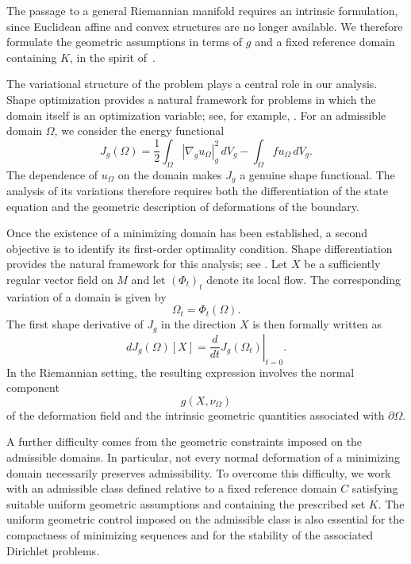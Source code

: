 \documentclass{article}
\begin{document}
The passage to a general Riemannian manifold requires an intrinsic formulation, since Euclidean affine and convex structures are no longer available. We therefore formulate the geometric assumptions in terms of $g$ and a fixed reference domain containing $K$, in the spirit of~\cite{Schu}.

The variational structure of the problem plays a central role in our
analysis. Shape optimization provides a natural framework for problems
in which the domain itself is an optimization variable; see, for
example, \cite{DZ,HP,sozo}. For an admissible domain $\Omega$, we
consider the energy functional
\begin{equation}
J_g(\Omega)
=
\frac12
\int_\Omega
|\nabla_g u_\Omega|_g^2\,dV_g
-
\int_\Omega f u_\Omega\,dV_g.
\label{eq:shape-functional-introduction}
\end{equation}
The dependence of $u_\Omega$ on the domain makes $J_g$ a genuine shape
functional. The analysis of its variations therefore requires both the
differentiation of the state equation and the geometric description of
deformations of the boundary.

Once the existence of a minimizing domain has been established, a
second objective is to identify its first-order optimality condition.
Shape differentiation provides the natural framework for this analysis;
see \cite{Da1,DZ,HP}. Let $X$ be a sufficiently regular vector field on
$M$ and let $(\Phi_t)_t$ denote its local flow. The corresponding
variation of a domain is given by
\[
\Omega_t=\Phi_t(\Omega).
\]
The first shape derivative of $J_g$ in the direction $X$ is then
formally written as
\[
dJ_g(\Omega)[X]
=
\left.
\frac{d}{dt}
J_g(\Omega_t)
\right|_{t=0}.
\]
In the Riemannian setting, the resulting expression involves the
normal component
\[
g(X,\nu_\Omega)
\]
of the deformation field and the intrinsic geometric quantities
associated with $\partial\Omega$.

A further difficulty comes from the geometric constraints imposed on
the admissible domains. In particular, not every normal deformation of
a minimizing domain necessarily preserves admissibility. To overcome
this difficulty, we work with an admissible class defined relative to a
fixed reference domain $C$ satisfying suitable uniform geometric
assumptions and containing the prescribed set $K$. The uniform
geometric control imposed on the admissible class is also essential for
the compactness of minimizing sequences and for the stability of the
associated Dirichlet problems.
\end{document}
